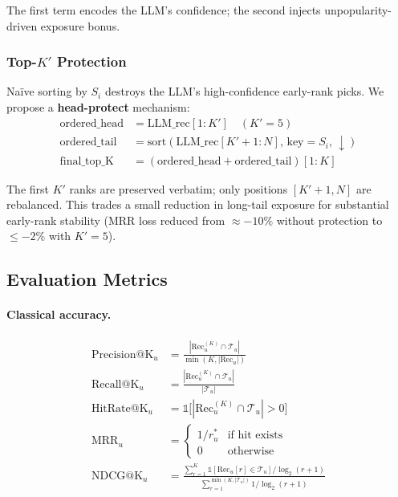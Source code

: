 The first term encodes the LLM's confidence; the second injects unpopularity-driven exposure bonus.

\subsubsection{Top-$K'$ Protection}

Naïve sorting by $S_i$ destroys the LLM's high-confidence early-rank picks. We propose a \textbf{head-protect} mechanism:
\begin{align*}
\text{ordered\_head} &= \text{LLM\_rec}[1{:}K'] \quad (K' = 5)\\
\text{ordered\_tail} &= \text{sort}(\text{LLM\_rec}[K'{+}1{:}N],\, \text{key}{=}S_i,\, \downarrow)\\
\text{final\_top\_K} &= (\text{ordered\_head} + \text{ordered\_tail})[1{:}K]
\end{align*}

The first $K'$ ranks are preserved verbatim; only positions $[K'{+}1, N]$ are rebalanced. This trades a small reduction in long-tail exposure for substantial early-rank stability (MRR loss reduced from ${\approx} -10\%$ without protection to $\leq -2\%$ with $K'=5$).

\subsection{Evaluation Metrics}
\label{subsec:evalmetrics}

\paragraph{Classical accuracy.}
\begin{align}
\text{Precision@K}_u &= \frac{|\text{Rec}_u^{(K)} \cap \mathcal{T}_u|}{\min(K, |\text{Rec}_u|)} \\
\text{Recall@K}_u &= \frac{|\text{Rec}_u^{(K)} \cap \mathcal{T}_u|}{|\mathcal{T}_u|} \\
\text{HitRate@K}_u &= \mathbb{1}\big[|\text{Rec}_u^{(K)} \cap \mathcal{T}_u| > 0\big] \\
\text{MRR}_u &= \begin{cases} 1/r^*_u & \text{if hit exists} \\ 0 & \text{otherwise} \end{cases} \\
\text{NDCG@K}_u &= \frac{\sum_{r=1}^{K} \mathbb{1}[\text{Rec}_u[r] \in \mathcal{T}_u] / \log_2(r+1)}{\sum_{r=1}^{\min(K,|\mathcal{T}_u|)} 1 / \log_2(r+1)}
\end{align}

